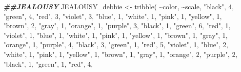 \documentclass[
]{article}
\newenvironment{Shaded}{\begin{snugshade}}{\end{snugshade}}
\newcommand{\DecValTok}[1]{\textcolor[rgb]{0.00,0.00,0.81}{#1}}
\newcommand{\DocumentationTok}[1]{\textcolor[rgb]{0.56,0.35,0.01}{\textbf{\textit{#1}}}}
\newcommand{\FunctionTok}[1]{\textcolor[rgb]{0.00,0.00,0.00}{#1}}
\newcommand{\NormalTok}[1]{#1}
\newcommand{\OtherTok}[1]{\textcolor[rgb]{0.56,0.35,0.01}{#1}}
\newcommand{\SpecialCharTok}[1]{\textcolor[rgb]{0.00,0.00,0.00}{#1}}
\newcommand{\StringTok}[1]{\textcolor[rgb]{0.31,0.60,0.02}{#1}}
\begin{document}
\begin{Shaded}
\begin{Highlighting}[]
\DocumentationTok{\#\#JEALOUSY}
\NormalTok{JEALOUSY\_debbie }\OtherTok{\textless{}{-}} \FunctionTok{tribble}\NormalTok{(}
  \SpecialCharTok{\textasciitilde{}}\NormalTok{color, }\SpecialCharTok{\textasciitilde{}}\NormalTok{scale,}
  \StringTok{"black"}\NormalTok{, }\DecValTok{4}\NormalTok{,}
  \StringTok{"green"}\NormalTok{, }\DecValTok{4}\NormalTok{,}
  \StringTok{"red"}\NormalTok{, }\DecValTok{3}\NormalTok{,}
  \StringTok{"violet"}\NormalTok{, }\DecValTok{3}\NormalTok{,}
  \StringTok{"blue"}\NormalTok{, }\DecValTok{1}\NormalTok{,}
  \StringTok{"white"}\NormalTok{, }\DecValTok{1}\NormalTok{,}
  \StringTok{"pink"}\NormalTok{, }\DecValTok{1}\NormalTok{,}
  \StringTok{"yellow"}\NormalTok{, }\DecValTok{1}\NormalTok{,}
  \StringTok{"brown"}\NormalTok{, }\DecValTok{2}\NormalTok{,}
  \StringTok{"gray"}\NormalTok{, }\DecValTok{1}\NormalTok{,}
  \StringTok{"orange"}\NormalTok{, }\DecValTok{1}\NormalTok{,}
  \StringTok{"purple"}\NormalTok{, }\DecValTok{3}\NormalTok{,}
    \StringTok{"black"}\NormalTok{, }\DecValTok{1}\NormalTok{,}
  \StringTok{"green"}\NormalTok{, }\DecValTok{6}\NormalTok{,}
  \StringTok{"red"}\NormalTok{, }\DecValTok{1}\NormalTok{,}
  \StringTok{"violet"}\NormalTok{, }\DecValTok{1}\NormalTok{,}
  \StringTok{"blue"}\NormalTok{, }\DecValTok{1}\NormalTok{,}
  \StringTok{"white"}\NormalTok{, }\DecValTok{1}\NormalTok{,}
  \StringTok{"pink"}\NormalTok{, }\DecValTok{1}\NormalTok{,}
  \StringTok{"yellow"}\NormalTok{, }\DecValTok{1}\NormalTok{,}
  \StringTok{"brown"}\NormalTok{, }\DecValTok{1}\NormalTok{,}
  \StringTok{"gray"}\NormalTok{, }\DecValTok{1}\NormalTok{,}
  \StringTok{"orange"}\NormalTok{, }\DecValTok{1}\NormalTok{,}
  \StringTok{"purple"}\NormalTok{, }\DecValTok{4}\NormalTok{,}
    \StringTok{"black"}\NormalTok{, }\DecValTok{3}\NormalTok{,}
  \StringTok{"green"}\NormalTok{, }\DecValTok{1}\NormalTok{,}
  \StringTok{"red"}\NormalTok{, }\DecValTok{5}\NormalTok{,}
  \StringTok{"violet"}\NormalTok{, }\DecValTok{1}\NormalTok{,}
  \StringTok{"blue"}\NormalTok{, }\DecValTok{2}\NormalTok{,}
  \StringTok{"white"}\NormalTok{, }\DecValTok{1}\NormalTok{, }
  \StringTok{"pink"}\NormalTok{, }\DecValTok{1}\NormalTok{,}
  \StringTok{"yellow"}\NormalTok{, }\DecValTok{1}\NormalTok{,}
  \StringTok{"brown"}\NormalTok{, }\DecValTok{1}\NormalTok{,}
  \StringTok{"gray"}\NormalTok{, }\DecValTok{1}\NormalTok{,}
  \StringTok{"orange"}\NormalTok{, }\DecValTok{2}\NormalTok{,}
  \StringTok{"purple"}\NormalTok{, }\DecValTok{2}\NormalTok{,}
    \StringTok{"black"}\NormalTok{, }\DecValTok{1}\NormalTok{,}
  \StringTok{"green"}\NormalTok{, }\DecValTok{1}\NormalTok{,}
  \StringTok{"red"}\NormalTok{, }\DecValTok{4}\NormalTok{,}

\end{Highlighting}
\end{Shaded}
\end{document}
